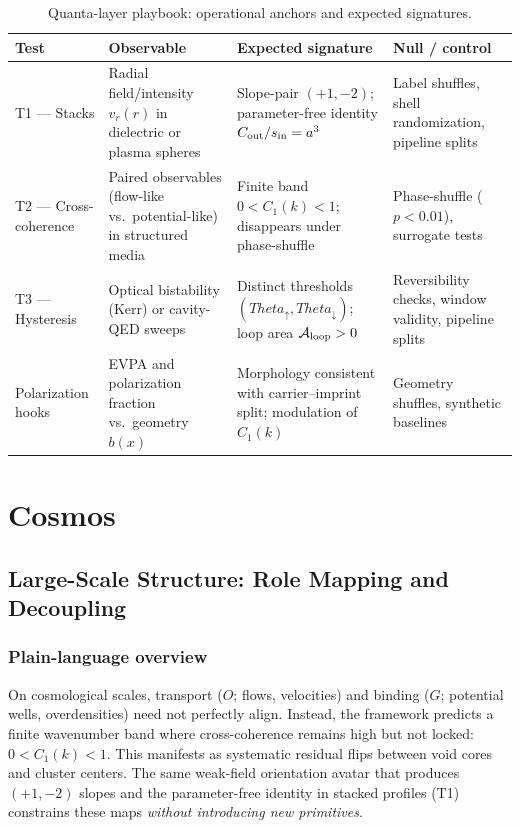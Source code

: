 \documentclass[12pt,a4paper,oneside]{scrreprt}
\def\Theta{Theta}%
\begin{document}
\begin{table}[h]
\centering
\caption{Quanta-layer playbook: operational anchors and expected signatures.}
\begin{tabular}{p{2.2cm} p{3.5cm} p{3.5cm} p{3.5cm}}
\toprule
\textbf{Test} & \textbf{Observable} & \textbf{Expected signature} & \textbf{Null / control} \\
\midrule
T1 — Stacks & Radial field/intensity $v_r(r)$ in dielectric or plasma spheres & Slope-pair $(+1,-2)$; parameter-free identity $C_{\rm out}/s_{\rm in}=a^3$ & Label shuffles, shell randomization, pipeline splits \\
\addlinespace
T2 — Cross-coherence & Paired observables (flow-like vs.\ potential-like) in structured media & Finite band $0 < C_1(k) < 1$; disappears under phase-shuffle & Phase-shuffle ($p < 0.01$), surrogate tests \\
\addlinespace
T3 — Hysteresis & Optical bistability (Kerr) or cavity-QED sweeps & Distinct thresholds $(\Theta_\uparrow, \Theta_\downarrow)$; loop area $\mathcal A_{\rm loop} > 0$ & Reversibility checks, window validity, pipeline splits \\
\addlinespace
Polarization hooks & EVPA and polarization fraction vs.\ geometry $b(x)$ & Morphology consistent with carrier–imprint split; modulation of $C_1(k)$ & Geometry shuffles, synthetic baselines \\
\bottomrule
\end{tabular}
\end{table}

\part{Cosmos}

\chapter{Large-Scale Structure: Role Mapping and Decoupling}\label{ch:lss-role}

\section*{Plain-language overview}

On cosmological scales, transport ($O$; flows, velocities) and binding ($G$; 
potential wells, overdensities) need not perfectly align. 
Instead, the framework predicts a finite wavenumber band where cross-coherence 
remains high but not locked: $0 < C_1(k) < 1$. 
This manifests as systematic residual flips between void cores and cluster centers. 
The same weak-field orientation avatar that produces $(+1,-2)$ slopes and the 
parameter-free identity in stacked profiles (T1) constrains these maps 
\emph{without introducing new primitives}. 
\end{document}
